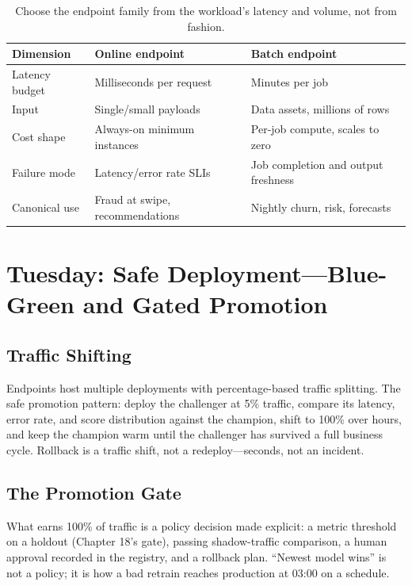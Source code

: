 \begin{table}[H]
\centering
\small
\begin{tabular}{@{}p{3.0cm}p{4.5cm}p{5.5cm}@{}}
\toprule
\textbf{Dimension} & \textbf{Online endpoint} & \textbf{Batch endpoint} \\
\midrule
Latency budget & Milliseconds per request & Minutes per job \\
Input & Single/small payloads & Data assets, millions of rows \\
Cost shape & Always-on minimum instances & Per-job compute, scales to zero \\
Failure mode & Latency/error rate SLIs & Job completion and output freshness \\
Canonical use & Fraud at swipe, recommendations & Nightly churn, risk, forecasts \\
\bottomrule
\end{tabular}
\caption{Choose the endpoint family from the workload's latency and volume, not from fashion.}
\label{tab:ch19-endpoints}
\end{table}

\section{Tuesday: Safe Deployment---Blue-Green and Gated Promotion}

\subsection{Traffic Shifting}
Endpoints host multiple deployments with percentage-based traffic splitting. The safe promotion pattern: deploy the challenger at 5\% traffic, compare its latency, error rate, and score distribution against the champion, shift to 100\% over hours, and keep the champion warm until the challenger has survived a full business cycle. Rollback is a traffic shift, not a redeploy---seconds, not an incident.

\subsection{The Promotion Gate}
What earns 100\% of traffic is a policy decision made explicit: a metric threshold on a holdout (Chapter 18's gate), passing shadow-traffic comparison, a human approval recorded in the registry, and a rollback plan. ``Newest model wins'' is not a policy; it is how a bad retrain reaches production at 03:00 on a schedule.

